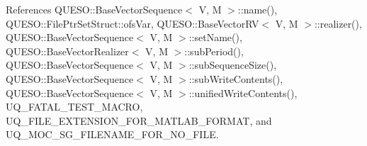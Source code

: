 References Q\-U\-E\-S\-O\-::\-Base\-Vector\-Sequence$<$ V, M $>$\-::name(), Q\-U\-E\-S\-O\-::\-File\-Ptr\-Set\-Struct\-::ofs\-Var, Q\-U\-E\-S\-O\-::\-Base\-Vector\-R\-V$<$ V, M $>$\-::realizer(), Q\-U\-E\-S\-O\-::\-Base\-Vector\-Sequence$<$ V, M $>$\-::set\-Name(), Q\-U\-E\-S\-O\-::\-Base\-Vector\-Realizer$<$ V, M $>$\-::sub\-Period(), Q\-U\-E\-S\-O\-::\-Base\-Vector\-Sequence$<$ V, M $>$\-::sub\-Sequence\-Size(), Q\-U\-E\-S\-O\-::\-Base\-Vector\-Sequence$<$ V, M $>$\-::sub\-Write\-Contents(), Q\-U\-E\-S\-O\-::\-Base\-Vector\-Sequence$<$ V, M $>$\-::unified\-Write\-Contents(), U\-Q\-\_\-\-F\-A\-T\-A\-L\-\_\-\-T\-E\-S\-T\-\_\-\-M\-A\-C\-R\-O, U\-Q\-\_\-\-F\-I\-L\-E\-\_\-\-E\-X\-T\-E\-N\-S\-I\-O\-N\-\_\-\-F\-O\-R\-\_\-\-M\-A\-T\-L\-A\-B\-\_\-\-F\-O\-R\-M\-A\-T, and U\-Q\-\_\-\-M\-O\-C\-\_\-\-S\-G\-\_\-\-F\-I\-L\-E\-N\-A\-M\-E\-\_\-\-F\-O\-R\-\_\-\-N\-O\-\_\-\-F\-I\-L\-E.


